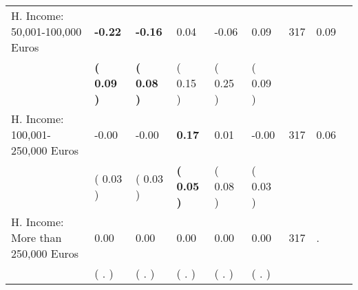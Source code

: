 \begin{tabular}{L{6.2cm} C{1.8cm} C{1.8cm} C{1.8cm} C{1.8cm} C{1.8cm} C{1.8cm} C{0.3cm} C{0.3cm}}
H. Income: 50,001-100,000 Euros & \textbf{    -0.22} & \textbf{    -0.16} &      0.04 &     -0.06 &      0.09  & 317 &       0.09 \\ 
 & \textbf{(     0.09 )} & \textbf{(     0.08 )} & (     0.15 ) & (     0.25 ) & (     0.09 )  & \\
H. Income: 100,001-250,000 Euros &     -0.00 &     -0.00 & \textbf{     0.17} &      0.01 &     -0.00  & 317 &       0.06 \\ 
 & (     0.03 ) & (     0.03 ) & \textbf{(     0.05 )} & (     0.08 ) & (     0.03 )  & \\
H. Income: More than 250,000 Euros &      0.00 &      0.00 &      0.00 &      0.00 &      0.00  & 317 &          . \\ 
 & (        . ) & (        . ) & (        . ) & (        . ) & (        . )  & \\
\bottomrule
\end{tabular}
